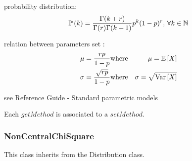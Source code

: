 \begin{description}
\begin{description}
  \end{description}

\item[Details :]  \rule{0pt}{1em}
  \begin{description}
  \item probability distribution:
    $$
    {\mathbb P}\left( k \right)  = \frac{\Gamma(k + r)}{\Gamma(r)\Gamma(k+1)}p^k(1-p)^r, \, \forall k \in \mathbb{N}
    $$
  \item relation between parameters set :
    \begin{eqnarray*}
      \mu  =  \frac{rp}{1-p}               & \mbox{where}& \mu ={\mathbb E}\left[ X \right] \\
      \sigma  = \frac{\sqrt{rp}}{1-p}  & \mbox{where}& \sigma =\sqrt{{\rm Var}\left[ X \right] }
    \end{eqnarray*}

  \end{description}
  \bigskip

\item[Links :]  \rule{0pt}{1em}
  \href{OpenTURNS_ReferenceGuide.pdf}{see Reference Guide - Standard parametric models}
\end{description}


Each  $getMethod$  is associated to a $setMethod$.




\newpage \subsubsection{NonCentralChiSquare}

This class inherits from the Distribution class.

